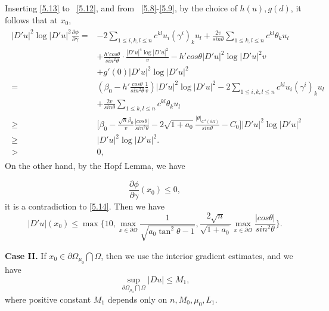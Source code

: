 \documentclass[11pt]{amsart}
\numberwithin{equation}{section}
\begin{document}
 Inserting \eqref{5.13} to ~\eqref{5.12}, and from ~\eqref{5.8}-\eqref{5.9}, by the choice of $h(u), g(d)$,  it follows that at $x_0$,
\begin{align}\label{5.14}
\begin{split}
|D'u|^2\log|D'u|^2\frac{\partial\phi}{\partial\gamma}=&-2\sum_{1\leq i,k,l\leq n}c^{kl}u_i(\gamma^i)_ku_l+\frac{2v}{sin\theta}\sum_{1\leq k,l\leq n}c^{kl}\theta_ku_l\\&+\frac{h'cos\theta}{sin^2\theta}\cdot\frac{|D'u|^4\log|D'u|^2}{v}
-h'cos\theta|D'u|^2\log|D'u|^2v\\& +g'(0)|D'u|^2\log|D'u|^2\\
=&(\beta_0-h'\frac{cos\theta}{sin^2\theta}\frac{1}{v})|D'u|^2\log|D'u|^2-2\sum_{1\leq i,k,l\leq n}c^{kl}u_i(\gamma^i)_ku_l\\&+\frac{2v}{sin\theta}\sum_{1\leq k,l\leq n}c^{kl}\theta_ku_l\\
\geq &\big[\beta_0-\frac{\sqrt{n}\beta_0}{v}\frac{|cos\theta|}{sin^2\theta}
-2\sqrt{1+a_0}\frac{|\theta|_{C^1(\partial\Omega)}}{sin\theta}-C_0\big]|D'u|^2\log|D'u|^2\\
\geq &|D'u|^2\log|D'u|^2.\\
>&0,
\end{split}
\end{align}
 On the other hand, by the Hopf Lemma, we have

  $$\frac{\partial\phi}{\partial\gamma}(x_0)\leq 0,$$ it is a contradiction to \eqref{5.14}.
Then we have
$$|D'u|(x_0)\leq\max\{10, \max_{x\in\partial\Omega}{\frac{1}{\sqrt{a_0\tan^2\theta-1}}}, \frac{2\sqrt{n}}{\sqrt{1+a_0}}\max_{x\in\partial\Omega}{\frac{|cos\theta|}{sin^2\theta}}\}.$$

{\bf Case II.}  If $ x_0\in \partial\Omega_{\mu_0}\bigcap\Omega$, then we use the interior gradient estimates, and
we have  $$\sup_{\partial\Omega_{\mu_0}\bigcap\Omega}|Du|\leq M_1,$$
where positive constant $M_1$ depends only on $n, M_0, \mu_0, L_1$.
\end{document}
